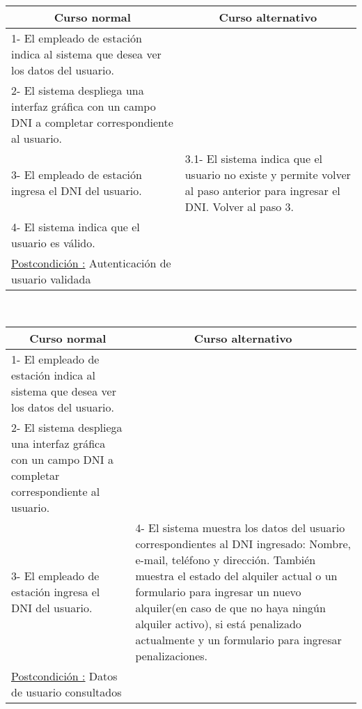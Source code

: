 \begin{center}
    \centering
    \begin{tabular}{ | p{11cm} | p{6cm} | }
    	\multicolumn{1}{c}{\cellcolor{black!30}\textbf{Curso normal}} & 
    	\multicolumn{1}{c}{\cellcolor{black!30}\textbf{Curso alternativo}} \\
		\hline
		1- El empleado de estación indica al sistema que desea ver los datos del usuario. &  \\ \hline
		2- El sistema despliega una interfaz gráfica con un campo DNI a completar correspondiente al usuario. &  \\ \hline
		3- El empleado de estación ingresa el DNI del usuario. &  
		3.1- El sistema indica que el usuario no existe y permite volver al paso anterior para ingresar el DNI. Volver al paso 3. \\ \hline
		4- El sistema indica que el usuario es válido. & \\ \hline
		\underline{Postcondición :} Autenticación de usuario validada & \\ \hline
    \end{tabular}
\end{center}

~

\begin{center}
    \centering
    \begin{tabular}{ | p{11cm} | p{6cm} | }
    	\multicolumn{1}{c}{\cellcolor{black!30}\textbf{Curso normal}} & 
    	\multicolumn{1}{c}{\cellcolor{black!30}\textbf{Curso alternativo}} \\
		\hline
		1- El empleado de estación indica al sistema que desea ver los datos del usuario. &  \\ \hline
		2- El sistema despliega una interfaz gráfica con un campo DNI a completar correspondiente al usuario. &  \\ \hline
		3- El empleado de estación ingresa el DNI del usuario. &  
		4- El sistema muestra los datos del usuario correspondientes al DNI ingresado: Nombre, e-mail, teléfono y dirección. También muestra el estado del alquiler actual o un formulario para ingresar un nuevo alquiler(en caso de que no haya ningún alquiler activo), si está penalizado actualmente y un formulario para ingresar penalizaciones. & \\ \hline		
		\underline{Postcondición :} Datos de usuario consultados & \\ \hline
    \end{tabular}
\end{center}

